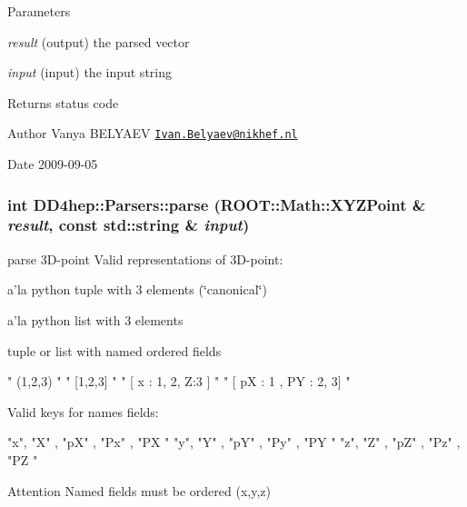 \begin{DoxyParams}{Parameters}
\item[{\em result}](output) the parsed vector \item[{\em input}](input) the input string \end{DoxyParams}
\begin{DoxyReturn}{Returns}
status code 
\end{DoxyReturn}
\begin{DoxyAuthor}{Author}
Vanya BELYAEV \href{mailto:Ivan.Belyaev@nikhef.nl}{\tt Ivan.Belyaev@nikhef.nl} 
\end{DoxyAuthor}
\begin{DoxyDate}{Date}
2009-\/09-\/05 
\end{DoxyDate}
\hypertarget{namespace_d_d4hep_1_1_parsers_a7d90cf46a4c38175eed16be4cbc97d20}{
\subsubsection[{parse}]{\setlength{\rightskip}{0pt plus 5cm}int DD4hep::Parsers::parse (ROOT::Math::XYZPoint \& {\em result}, \/  const std::string \& {\em input})}}
\label{namespace_d_d4hep_1_1_parsers_a7d90cf46a4c38175eed16be4cbc97d20}


parse 3D-\/point Valid representations of 3D-\/point:


\begin{DoxyItemize}
\item a'la python tuple with 3 elements (\char`\"{}canonical\char`\"{})
\item a'la python list with 3 elements
\item tuple or list with named ordered fields
\end{DoxyItemize}


\begin{DoxyCode}
    " (1,2,3) "
    " [1,2,3] "
    " [ x : 1, 2, Z:3 ] "
    " [ pX : 1 , PY : 2, 3] "
\end{DoxyCode}


Valid keys for names fields:


\begin{DoxyCode}
    "x", "X" , "pX" , "Px" , "PX "
    "y", "Y" , "pY" , "Py" , "PY "
    "z", "Z" , "pZ" , "Pz" , "PZ "
\end{DoxyCode}


\begin{DoxyAttention}{Attention}
Named fields must be ordered {\ttfamily (x,y,z)}
\end{DoxyAttention}

